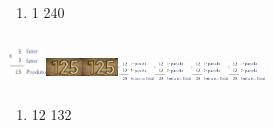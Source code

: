 \begin{enumerate}
\def\labelenumi{\alph{enumi})}
\item
  1 240
\end{enumerate}

\includegraphics[width=0.39170in,height=0.51671in]{media/image12.png}\includegraphics[width=0.37503in,height=0.40003in]{media/image9.png}\includegraphics[width=0.37503in,height=0.40003in]{media/image9.png}\includegraphics[width=0.38337in,height=0.31669in]{media/image10.png}\includegraphics[width=0.38337in,height=0.31669in]{media/image10.png}\includegraphics[width=0.38337in,height=0.31669in]{media/image10.png}\includegraphics[width=0.38337in,height=0.31669in]{media/image10.png}

\begin{enumerate}
\def\labelenumi{\alph{enumi})}
\item
  12 132
\end{enumerate}

